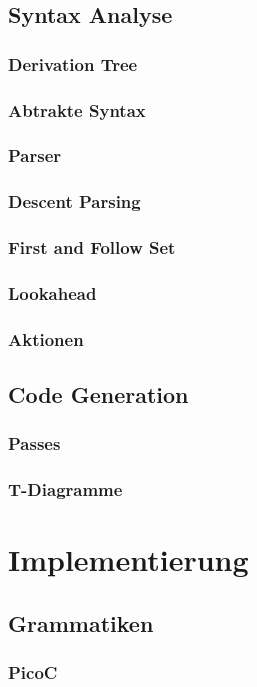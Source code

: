 \documentclass{scrreprt}
\begin{document}
  \section{Syntax Analyse}
  \subsection{Derivation Tree}
  \subsection{Abtrakte Syntax}
  \subsection{Parser}
  \subsection{Descent Parsing}
  \subsection{First and Follow Set}
  \subsection{Lookahead}
  \subsection{Aktionen}
  \section{Code Generation}
  \subsection{Passes}
  \subsection{T-Diagramme}
  \chapter{Implementierung}
  \section{Grammatiken}
  \subsection{PicoC}
\end{document}
